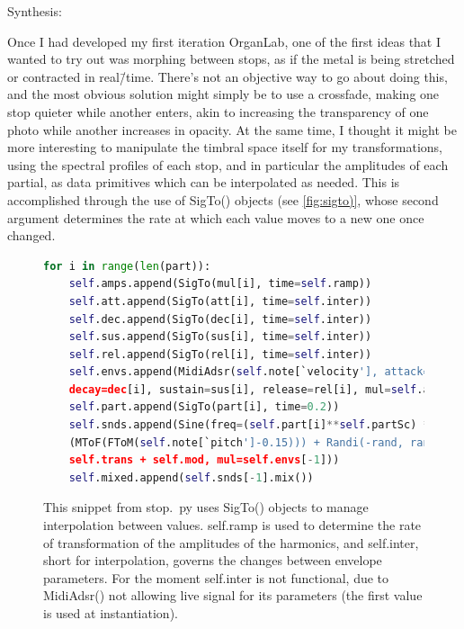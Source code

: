\documentclass[12pt,twoside,maitrise]{dms_ks}
\theoremstyle{definition}
\begin{document}
{Synthesis:

Once I had developed my first iteration OrganLab, one of the first ideas that I wanted to try out was morphing between stops, as if the metal is being stretched or contracted in real\=/time.
There's not an objective way to go about doing this, and the most obvious solution might simply be to use a crossfade, making one stop quieter while another enters, akin to increasing the transparency of one photo while another increases in opacity.
At the same time, I thought it might be more interesting to manipulate the timbral space itself for my transformations, using the spectral profiles of each stop, and in particular the amplitudes of each partial, as data primitives which can be interpolated as needed.
This is accomplished through the use of SigTo() objects (see \cref{fig:sigto)}, whose second argument determines the rate at which each value moves to a new one once changed.

\begin{figure}[H]
\begin{lstlisting}[language=Python]
for i in range(len(part)):
    self.amps.append(SigTo(mul[i], time=self.ramp))
    self.att.append(SigTo(att[i], time=self.inter))
    self.dec.append(SigTo(dec[i], time=self.inter))
    self.sus.append(SigTo(sus[i], time=self.inter))
    self.rel.append(SigTo(rel[i], time=self.inter))
    self.envs.append(MidiAdsr(self.note[`velocity'], attack=att[i],
    decay=dec[i], sustain=sus[i], release=rel[i], mul=self.amps[-1]))
    self.part.append(SigTo(part[i], time=0.2))
    self.snds.append(Sine(freq=(self.part[i]**self.partSc) * 
    (MToF(FToM(self.note[`pitch']-0.15))) + Randi(-rand, rand, 5) + 
    self.trans + self.mod, mul=self.envs[-1]))
    self.mixed.append(self.snds[-1].mix())
\end{lstlisting}
\caption{This snippet from stop.~py uses SigTo() objects to manage interpolation between values. self.ramp is used to determine the rate of transformation of the amplitudes of the harmonics, and self.inter, short for interpolation, governs the changes between envelope parameters. For the moment self.inter is not functional, due to MidiAdsr() not allowing live signal for its parameters (the first value is used at instantiation).} 
\label{fig:sigto}
\end{figure}

}
\end{document}
